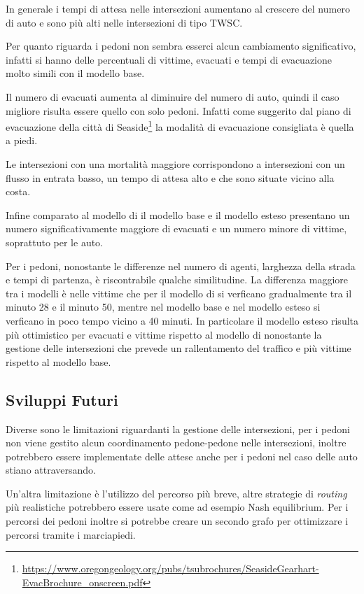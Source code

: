In generale i tempi di attesa nelle intersezioni aumentano al crescere del numero di auto e sono più alti nelle intersezioni di tipo TWSC.

Per quanto riguarda i pedoni non sembra esserci alcun cambiamento significativo,
infatti si hanno delle percentuali di vittime, evacuati e tempi di evacuazione molto simili con il modello base.

Il numero di evacuati aumenta al diminuire del numero di auto, quindi il caso migliore risulta essere quello con solo pedoni.
Infatti come suggerito dal piano di evacuazione della città di Seaside\footnote{\url{https://www.oregongeology.org/pubs/tsubrochures/SeasideGearhart-EvacBrochure_onscreen.pdf}}
la modalità di evacuazione consigliata è quella a piedi.

Le intersezioni con una mortalità maggiore corrispondono a  
intersezioni con un flusso in entrata basso, un tempo di attesa alto e che sono situate vicino alla costa.

Infine comparato al modello di \textcite{wang2021novel} il modello base e il modello esteso presentano un numero significativamente maggiore di evacuati e un numero minore di vittime, soprattuto per le auto.

Per i pedoni, nonostante le differenze nel numero di agenti, larghezza della strada e tempi di partenza, è riscontrabile qualche similitudine. 
La differenza maggiore tra i modelli è nelle vittime che per il modello di \textcite{wang2021novel} si verficano gradualmente tra il minuto 28 e il minuto 50, mentre nel modello
base e nel modello esteso si verficano in poco tempo vicino a 40 minuti.
In particolare il modello esteso risulta più ottimistico per evacuati e vittime rispetto al modello di \textcite{wang2021novel} nonostante la gestione delle intersezioni 
che prevede un rallentamento del traffico e più vittime rispetto al modello base.

\subsection{Sviluppi Futuri}
Diverse sono le limitazioni riguardanti la gestione delle intersezioni, per i pedoni non viene gestito alcun coordinamento pedone-pedone nelle intersezioni, inoltre
potrebbero essere implementate delle attese anche per i pedoni nel caso delle auto stiano attraversando.

Un'altra limitazione è l'utilizzo del percorso più breve, altre strategie di \textit{routing} più realistiche potrebbero essere usate come ad esempio Nash equilibrium.
Per i percorsi dei pedoni inoltre si potrebbe creare un secondo grafo per ottimizzare i percorsi tramite i marciapiedi.

